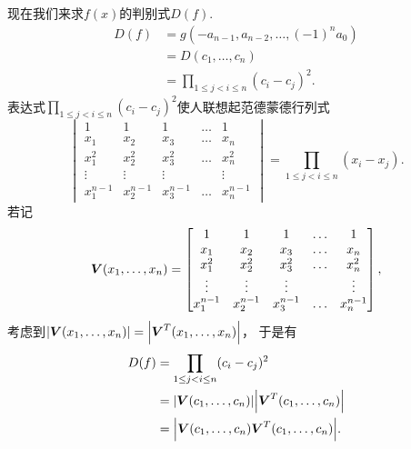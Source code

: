 现在我们来求\(f(x)\)的判别式\(D(f)\).
\begin{align*}
	D(f)
	&= g(-a_{n-1},a_{n-2},\dotsc,(-1)^n a_0) \\
	&= D(c_1,\dotsc,c_n) \\
	&= \prod_{1\leq j<i\leq n} (c_i-c_j)^2.
\end{align*}
表达式\(\prod_{1\leq j<i\leq n} (c_i-c_j)^2\)使人联想起范德蒙德行列式\begin{equation*}
	\begin{vmatrix}
		1 & 1 & 1 & \dots & 1 \\
		x_1 & x_2 & x_3 & \dots & x_n \\
		x_1^2 & x_2^2 & x_3^2 & \dots & x_n^2 \\
		\vdots & \vdots & \vdots& & \vdots \\
		x_1^{n-1} & x_2^{n-1} & x_3^{n-1} & \dots & x_n^{n-1}
	\end{vmatrix}
	= \prod_{1 \leq j < i \leq n}(x_i-x_j).
\end{equation*}
若记\begin{equation*}
	\boldsymbol{V}(x_1,\dotsc,x_n) = \begin{bmatrix}
		1 & 1 & 1 & \dots & 1 \\
		x_1 & x_2 & x_3 & \dots & x_n \\
		x_1^2 & x_2^2 & x_3^2 & \dots & x_n^2 \\
		\vdots & \vdots & \vdots& & \vdots \\
		x_1^{n-1} & x_2^{n-1} & x_3^{n-1} & \dots & x_n^{n-1}
	\end{bmatrix},
\end{equation*}
考虑到\(\abs{\boldsymbol{V}(x_1,\dotsc,x_n)}=\abs{\boldsymbol{V}^T(x_1,\dotsc,x_n)}\)，
于是有\begin{align*}
	D(f)
	&= \prod_{1\leq j<i\leq n} (c_i-c_j)^2 \\
	&= \abs{\boldsymbol{V}(c_1,\dotsc,c_n)} \abs{\boldsymbol{V}^T(c_1,\dotsc,c_n)} \\
	&= \abs{\boldsymbol{V}(c_1,\dotsc,c_n) \boldsymbol{V}^T(c_1,\dotsc,c_n)}.
\end{align*}
